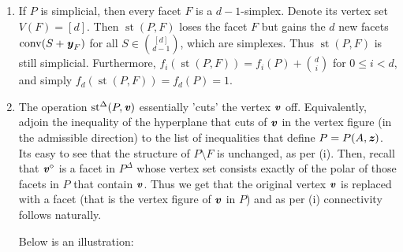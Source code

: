 \documentclass{article}
\begin{document}
\begin{enumerate}
\begin{solution}
\begin{enumerate}[label=(\roman*)]
\item If $P$ is simplicial, then every facet $F$ is a $d-1$-simplex. Denote its vertex set $V(F) = [d]$. Then $\operatorname{st}(P, F)$ loses the facet $F$ but gains the $d$ new facets $\operatorname{conv}(S + \textbf{\textit{y}}_F)$ for all $S \in \binom{[d]}{d-1}$, which are simplexes. Thus $\operatorname{st}(P,F) $ is still simplicial. Furthermore, $f_i(\operatorname{st}(P, F)) = f_i(P) + \binom{d}{i}$ for $0 \leq i < d$, and simply $f_d(\operatorname{st}(P,F)) = f_d(P) = 1$. 
    
 \item The operation $\operatorname{st}^{\Delta}(P,\textbf{\textit{v}})$ essentially 'cuts' the vertex $\textbf{\textit{v}}$ off. Equivalently, adjoin the inequality of the hyperplane that cuts of $\textbf{\textit{v}}$ in the vertex figure (in the admissible direction) to the list of inequalities that define $P = P(A, \textbf{\textit{z}})$. Its easy to see that the structure of $P \setminus F$ is unchanged, as per (i). Then, recall that $\textbf{\textit{v}}^\diamond$ is a facet in $P^\Delta$ whose vertex set consists exactly of the polar of those facets in $P$ that contain $\textbf{\textit{v}}$. Thus we get that the original vertex $\textbf{\textit{v}}$ is replaced with a facet (that is the vertex figure of $\textbf{\textit{v}}$ in $P$) and as per (i) connectivity follows naturally.

 
 Below is an illustration:

\begin{figure}[h]
    \centering
{}
\end{figure}
\end{enumerate}
\end{solution}
\end{enumerate}
\end{document}
